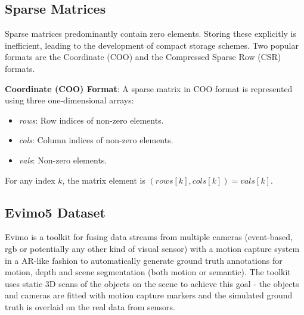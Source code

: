 \subsection{Sparse Matrices}
Sparse matrices predominantly contain zero elements. Storing these explicitly is inefficient, leading to the development of compact storage schemes. Two popular formats are the Coordinate (COO) and the Compressed Sparse Row (CSR) formats.

\textbf{Coordinate (COO) Format}:
A sparse matrix in COO format is represented using three one-dimensional arrays:
\begin{itemize}
    \item \textit{rows}: Row indices of non-zero elements.
    \item \textit{cols}: Column indices of non-zero elements.
    \item \textit{vals}: Non-zero elements.
\end{itemize}
For any index $k$, the matrix element is $(\textit{rows}[k], \textit{cols}[k]) = \textit{vals}[k]$.


\subsection{Evimo5 Dataset}
Evimo is a toolkit for fusing data streams from multiple cameras (event-based, rgb or potentially any other kind of visual sensor) with a motion capture system in a AR-like fashion to automatically generate ground truth annotations for motion, depth and scene segmentation (both motion or semantic). The toolkit uses static 3D scans of the objects on the scene to achieve this goal - the objects and cameras are fitted with motion capture markers and the simulated ground truth is overlaid on the real data from sensors.
